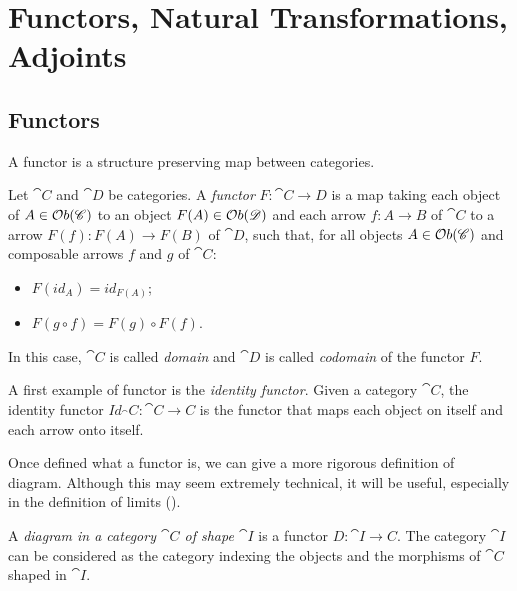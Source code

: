 \section{Functors, Natural Transformations, Adjoints}\label{sect:funct_nats}


\subsection{Functors}

A functor is a structure preserving map between categories. 
\begin{definition}[Functor]
    Let $\cat{C}$ and $\cat{D}$ be categories. A \emph{functor} $F:\cat{C \rightarrow D}$ is a map taking each object of $A \in \mathcal{O}b(\mathscr{C})$ to an object $F(A) \in \mathcal{O}b(\mathscr{D})$ and each arrow $f:A\rightarrow B$ of $\cat C$ to a arrow $F(f): F(A) \rightarrow F(B)$ of $\cat D$, such that, for all objects $A \in \mathcal{O}b(\mathscr{C})$ and composable arrows $f$ and $g$ of $\cat C$:
    \begin{itemize}
        \item $F(id_{A}) = id_{F(A)}$;
        \item $F(g \circ f) = F(g) \circ F(f)$.
    \end{itemize}

    In this case, $\cat C$ is called \emph{domain} and $\cat D$ is called \emph{codomain} of the functor $F$.
\end{definition}

\begin{example}
    A first example of functor is the \emph{identity functor}. Given a category $\cat C$, the identity functor $Id_\cat C :\cat{C \rightarrow C}$ is the functor that maps each object on itself and each arrow onto itself. 
\end{example}

Once defined what a functor is, we can give a more rigorous definition of diagram. Although this may seem extremely technical, it will be useful, especially in the definition of limits ().

\begin{definition}[Diagram]\label{def:diagram}
    A \emph{diagram in a category $\cat C$ of shape $\cat I$} is a functor $D: \cat{I \rightarrow C}$.
    The category $\cat I$ can be considered as the category indexing the objects and the morphisms of $\cat C$ shaped in $\cat I$.
\end{definition}

